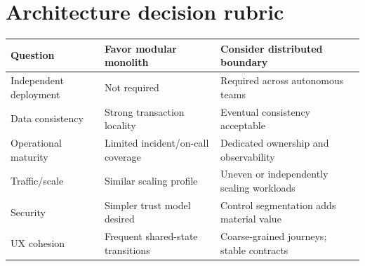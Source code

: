\documentclass[11pt]{article}
\begin{document}
\section{Architecture decision rubric}

\begin{tabularx}{\linewidth}{@{}>{\raggedright\arraybackslash}p{38mm}>{\raggedright\arraybackslash}X>{\raggedright\arraybackslash}X@{}}\toprule
Question & Favor modular monolith & Consider distributed boundary\\\midrule
Independent deployment & Not required & Required across autonomous teams\\
Data consistency & Strong transaction locality & Eventual consistency acceptable\\
Operational maturity & Limited incident/on-call coverage & Dedicated ownership and observability\\
Traffic/scale & Similar scaling profile & Uneven or independently scaling workloads\\
Security & Simpler trust model desired & Control segmentation adds material value\\
UX cohesion & Frequent shared-state transitions & Coarse-grained journeys; stable contracts\\
\bottomrule\end{tabularx}


\clearpage

\end{document}
